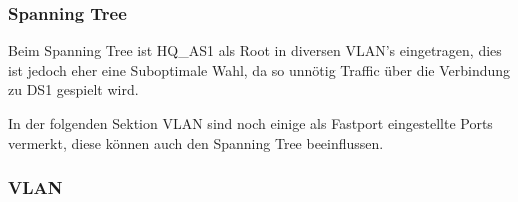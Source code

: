 \subsubsection{Spanning Tree}

Beim Spanning Tree ist HQ\_AS1 als Root in diversen VLAN's eingetragen, dies ist jedoch eher eine Suboptimale Wahl, da so unnötig Traffic über die Verbindung zu DS1 gespielt wird.


In der folgenden Sektion VLAN sind noch einige als Fastport eingestellte Ports vermerkt, diese können auch den Spanning Tree beeinflussen.

\subsubsection{VLAN}
